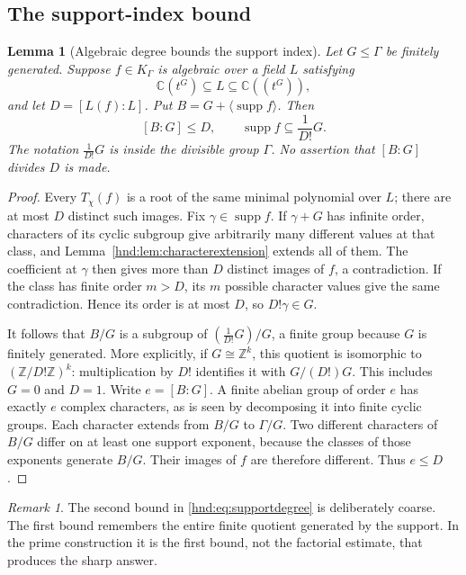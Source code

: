 \documentclass[11pt,oneside]{article}
\newtheorem{lemma}[theorem]{Lemma}
\theoremstyle{definition}
\theoremstyle{remark}
\newtheorem{remark}[theorem]{Remark}
\newcommand{\C}{\mathbb C}
\newcommand{\Z}{\mathbb Z}
\newcommand{\supp}{\operatorname{supp}}
\begin{document}
\subsection{The support-index bound}

\begin{lemma}[Algebraic degree bounds the support index]\label{hnd:lem:supportdegree}
Let $G\le\Gamma$ be finitely generated. Suppose $f\in K_\Gamma$ is
algebraic over a field $L$ satisfying
\[
 \C(t^G)\subseteq L\subseteq\C((t^G)),
\]
and let $D=[L(f):L]$. Put $B=G+\langle\supp f\rangle$.
Then
\begin{equation}\label{hnd:eq:supportdegree}
 [B:G]\le D,
 \qquad
 \supp f\subseteq\frac1{D!}G.
\end{equation}
The notation $\frac1{D!}G$ is inside the divisible group $\Gamma$.
No assertion that $[B:G]$ divides $D$ is made.
\end{lemma}
\begin{proof}
Every $T_\chi(f)$ is a root of the same minimal polynomial over $L$;
there are at most $D$ distinct such images. Fix
$\gamma\in\supp f$. If $\gamma+G$ has infinite order, characters of
its cyclic subgroup give arbitrarily many different values at that
class, and Lemma~\ref{hnd:lem:characterextension} extends all of them.
The coefficient at $\gamma$ then gives more than $D$ distinct images of
$f$, a contradiction. If the class has finite order $m>D$, its $m$
possible character values give the same contradiction. Hence its order
is at most $D$, so $D!\gamma\in G$.

It follows that $B/G$ is a subgroup of
$(\frac1{D!}G)/G$, a finite group because $G$ is finitely generated.
More explicitly, if $G\cong\Z^k$, this quotient is isomorphic to
$(\Z/D!\Z)^k$: multiplication by $D!$ identifies it with $G/(D!)G$.
This includes $G=0$ and $D=1$.
Write $e=[B:G]$. A finite abelian group of order $e$ has exactly $e$
complex characters, as is seen by decomposing it into finite cyclic
groups. Each character extends from $B/G$ to $\Gamma/G$.
Two different characters of $B/G$ differ on at least one support
exponent, because the classes of those exponents generate $B/G$.
Their images of $f$ are therefore different. Thus $e\le D$.
\end{proof}

\begin{remark}
The second bound in \eqref{hnd:eq:supportdegree} is deliberately coarse.
The first bound remembers the entire finite quotient generated by the
support. In the prime construction it is the first bound, not the
factorial estimate, that produces the sharp answer.
\end{remark}
\end{document}
